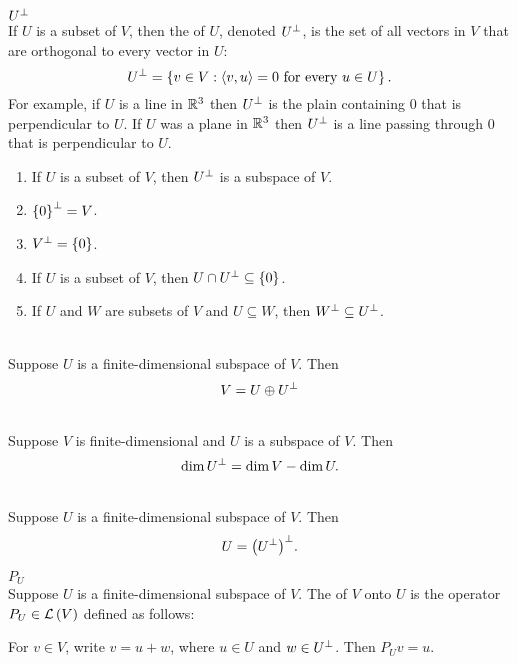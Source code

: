
 ${U}^{\perp}$
\\If $U$ is a subset of $V$, then the  of $U$, denoted ${U}^{\perp}$, is the set of all vectors in $V$ that are orthogonal to every vector in $U$:
$${U}^{\perp} = \left\{{v \in V : \left\langle{v,u}\right\rangle = 0 \text{ for every } u \in U}\right\}.$$
\noindent For example, if $U$ is a line in $\mathbb{R}^3$ then ${U}^{\perp}$ is the plain containing $0$ that is perpendicular to $U$. If $U$ was a plane in $\mathbb{R}^3$ then ${U}^{\perp}$ is a line passing through $0$ that is perpendicular to $U$.

\begin{enumerate}[label=(\alph*)]
    \item If $U$ is a subset of $V$, then ${U}^{\perp}$ is a subspace of $V$. 
    \item ${\left\{{0}\right\}}^{\perp} = V$.
    \item ${V}^{\perp} = \left\{{0}\right\}$.
    \item If $U$ is a subset of $V$, then $U \cap {U}^{\perp} \subseteq \left\{{0}\right\}$.
    \item If $U$ and $W$ are subsets of $V$ and $U \subseteq W$, then ${W}^{\perp} \subseteq {U}^{\perp}$. 
\end{enumerate}

\\
Suppose $U$ is a finite-dimensional subspace of $V$. Then
$$V = U \oplus {U}^{\perp}$$

\\
Suppose $V$ is finite-dimensional and $U$ is a subspace of $V$. Then 
$$\dim {U}^{\perp} = \dim V - \dim U.$$

\\
Suppose $U$ is a finite-dimensional subspace of $V$. Then 
$$U = {\left( {{U}^{\perp}} \right)}^{\perp}.$$

 $P_U$
\\Suppose $U$ is a finite-dimensional subspace of $V$. The  of $V$ onto $U$ is the operator $P_U \in \mathcal{L}\left({V}\right)$ defined as follows:
\begin{center}For $v\in V$, write $v = u + w$, where $u \in U$ and $w \in {U}^{\perp}$. Then $P_Uv = u.$\end{center}

